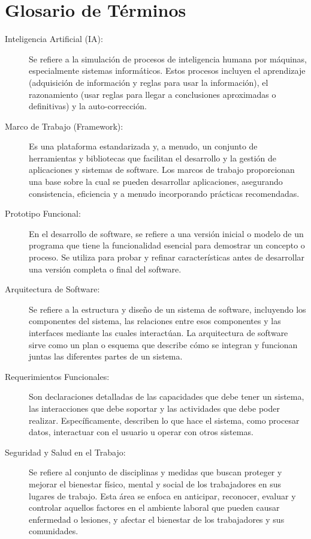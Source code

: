 \section{Glosario de Términos}
\begin{description}
    \item [Inteligencia Artificial (IA):] Se refiere a la simulación de procesos de inteligencia humana por máquinas, especialmente sistemas informáticos. Estos procesos incluyen el aprendizaje (adquisición de información y reglas para usar la información), el razonamiento (usar reglas para llegar a conclusiones aproximadas o definitivas) y la auto-corrección.
    
    \item [Marco de Trabajo (Framework):] Es una plataforma estandarizada y, a menudo, un conjunto de herramientas y bibliotecas que facilitan el desarrollo y la gestión de aplicaciones y sistemas de software. Los marcos de trabajo proporcionan una base sobre la cual se pueden desarrollar aplicaciones, asegurando consistencia, eficiencia y a menudo incorporando prácticas recomendadas.

    \item [Prototipo Funcional:] En el desarrollo de software, se refiere a una versión inicial o modelo de un programa que tiene la funcionalidad esencial para demostrar un concepto o proceso. Se utiliza para probar y refinar características antes de desarrollar una versión completa o final del software.
    
    \item [Arquitectura de Software:] Se refiere a la estructura y diseño de un sistema de software, incluyendo los componentes del sistema, las relaciones entre esos componentes y las interfaces mediante las cuales interactúan. La arquitectura de software sirve como un plan o esquema que describe cómo se integran y funcionan juntas las diferentes partes de un sistema.

    \item [Requerimientos Funcionales:] Son declaraciones detalladas de las capacidades que debe tener un sistema, las interacciones que debe soportar y las actividades que debe poder realizar. Específicamente, describen lo que hace el sistema, como procesar datos, interactuar con el usuario u operar con otros sistemas.

    \item [Seguridad y Salud en el Trabajo:] Se refiere al conjunto de disciplinas y medidas que buscan proteger y mejorar el bienestar físico, mental y social de los trabajadores en sus lugares de trabajo. Esta área se enfoca en anticipar, reconocer, evaluar y controlar aquellos factores en el ambiente laboral que pueden causar enfermedad o lesiones, y afectar el bienestar de los trabajadores y sus comunidades.


\end{description}
